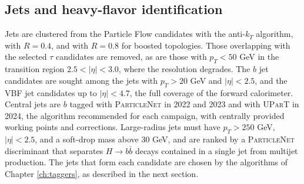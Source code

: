 \subsection{Jets and heavy-flavor identification}
%
Jets are clustered from the Particle Flow candidates with the anti-$k_T$ algorithm, with $R = 0.4$, and with $R = 0.8$ for boosted topologies. Those overlapping with the selected $\tau$ candidates are removed, as are those with $p_T < 50$ GeV in the transition region $2.5 < |\eta| < 3.0$, where the resolution degrades. The $b$ jet candidates are sought among the jets with $p_T > 20$ GeV and $|\eta| < 2.5$, and the VBF jet candidates up to $|\eta| < 4.7$, the full coverage of the forward calorimeter. Central jets are $b$ tagged with \textsc{ParticleNet} in 2022 and 2023 and with \textsc{UParT} in 2024, the algorithm recommended for each campaign, with centrally provided working points and corrections. Large-radius jets must have $p_T > 250$ GeV, $|\eta| < 2.5$, and a soft-drop mass above $30$ GeV, and are ranked by a \textsc{ParticleNet} discriminant that separates $H\to b\bar{b}$ decays contained in a single jet from multijet production. The jets that form each candidate are chosen by the algorithms of Chapter \ref{ch:taggers}, as described in the next section.



